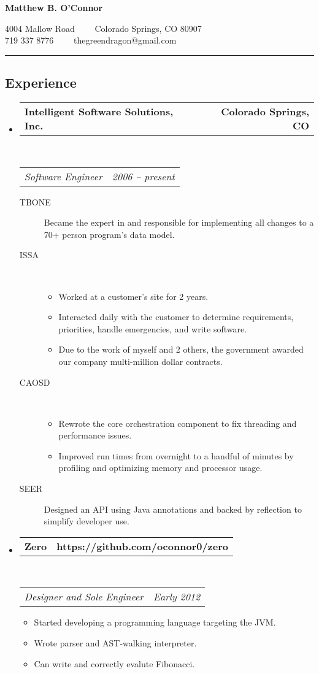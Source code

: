 \documentclass[10pt,letterpaper]{article}
\makeatletter
\newcommand{\headerrow}[2]
{\begin{tabular*}{\linewidth}{l@{\extracolsep{\fill}}r}
	#1 &
	#2 \\
\end{tabular*}}
\makeatother
\begin{document}
\begin{center}
{\LARGE \textbf{Matthew B. O'Connor}}

4004 Mallow Road\ \ \textbullet
\ \ Colorado Springs, CO 80907
\\
719 337 8776\ \ \textbullet
\ \ thegreendragon@gmail.com
\end{center}

\hrule
\vspace{-0.4em}
\subsection*{Experience}

\begin{itemize}
	\parskip=0.1em

	\item
	\headerrow
		{\textbf{Intelligent Software Solutions, Inc.}}
		{\textbf{Colorado Springs, CO}}
	\\
	\headerrow
		{\emph{Software Engineer}}
		{\emph{2006 -- present}}
	\begin{description}
		\item[TBONE] Became the expert in and responsible for implementing all changes to a 70+ person program's data model.
		\item[ISSA] \
			\begin{itemize}
				\item Worked at a customer's site for 2  years.
				\item Interacted daily with the customer to determine requirements, priorities, handle emergencies, and write software.
				\item Due to the work of myself and 2 others, the government awarded our company multi-million dollar contracts.
			\end{itemize}
		\item[CAOSD] \
			\begin{itemize}
				\item Rewrote the core orchestration component to fix threading and performance issues.
				\item Improved run times from overnight to a handful of minutes by profiling and optimizing memory and processor usage.
			\end{itemize}
		\item[SEER] Designed an API using Java annotations and backed by reflection to simplify developer use.
	\end{description}

	\item
	\headerrow
		{\textbf{Zero}}
		{\textbf{https://github.com/oconnor0/zero}}
	\\
	\headerrow
		{\emph{Designer and Sole Engineer}}
		{\emph{Early 2012}}
	\begin{itemize}
		\item Started developing a programming language targeting the JVM.
		\item Wrote parser and AST-walking interpreter.
		\item Can write and correctly evalute Fibonacci.
	\end{itemize}


\end{itemize}
\end{document}
